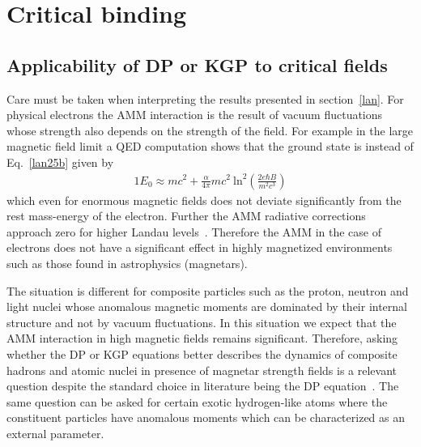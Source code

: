 \documentclass[epj]{svjour}
\begin{document}
\section{Critical binding} \label{sb}
\subsection{Applicability of DP or KGP to critical fields}\label{vacfl}
Care must be taken when interpreting the results presented in section~\ref{lan}. For physical electrons the AMM interaction is the result of vacuum fluctuations whose strength also depends on the strength of the field. For example in the large magnetic field limit a QED computation shows that the ground state is instead of Eq.~\eqref{lan25b} given by~\cite{Jancovici:1970ep}
\begin{alignat}{1} \label{vacfl01}
E_{0}\approx mc^{2}+\frac{\alpha}{4\pi}mc^{2}\ \mathrm{ln}^{2}\left(\frac{2e\hbar B}{m^{2}c^{3}}\right)
\end{alignat}
which even for enormous magnetic fields does not deviate significantly from the rest mass-energy of the electron. Further the AMM  radiative corrections approach zero for higher Landau levels~\cite{Ferrer:2015wca}. Therefore the AMM in the case of electrons does not have a significant effect in highly magnetized environments such as those found in astrophysics (magnetars).

The situation is different for composite particles such as the proton, neutron and light nuclei whose anomalous magnetic moments are dominated by their internal structure and not by vacuum fluctuations. In this situation we expect that the AMM interaction in high magnetic fields remains significant. Therefore, asking whether the DP or KGP equations better describes the dynamics of composite hadrons and atomic nuclei in presence of magnetar strength fields is a relevant question despite the standard choice in literature being the DP equation~\cite{Broderick:2000pe}. The same question can be asked for certain exotic hydrogen-like atoms where the constituent particles have anomalous moments which can be characterized as an external parameter. 
\end{document}
